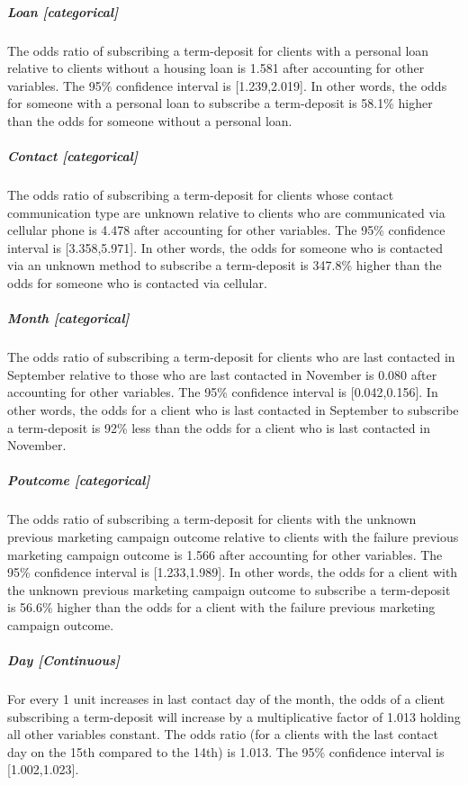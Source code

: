 \documentclass[]{article}
\let\oldsubparagraph\subparagraph
\renewcommand{\subparagraph}[1]{\oldsubparagraph{#1}\mbox{}}
\begin{document}
\subparagraph{Loan {[}categorical{]}}\label{loan-categorical}

The odds ratio of subscribing a term-deposit for clients with a personal
loan relative to clients without a housing loan is 1.581 after
accounting for other variables. The 95\% confidence interval is
{[}1.239,2.019{]}. In other words, the odds for someone with a personal
loan to subscribe a term-deposit is 58.1\% higher than the odds for
someone without a personal loan.

\subparagraph{Contact {[}categorical{]}}\label{contact-categorical}

The odds ratio of subscribing a term-deposit for clients whose contact
communication type are unknown relative to clients who are communicated
via cellular phone is 4.478 after accounting for other variables. The
95\% confidence interval is {[}3.358,5.971{]}. In other words, the odds
for someone who is contacted via an unknown method to subscribe a
term-deposit is 347.8\% higher than the odds for someone who is
contacted via cellular.

\subparagraph{Month {[}categorical{]}}\label{month-categorical}

The odds ratio of subscribing a term-deposit for clients who are last
contacted in September relative to those who are last contacted in
November is 0.080 after accounting for other variables. The 95\%
confidence interval is {[}0.042,0.156{]}. In other words, the odds for a
client who is last contacted in September to subscribe a term-deposit is
92\% less than the odds for a client who is last contacted in November.

\subparagraph{Poutcome {[}categorical{]}}\label{poutcome-categorical}

The odds ratio of subscribing a term-deposit for clients with the
unknown previous marketing campaign outcome relative to clients with the
failure previous marketing campaign outcome is 1.566 after accounting
for other variables. The 95\% confidence interval is {[}1.233,1.989{]}.
In other words, the odds for a client with the unknown previous
marketing campaign outcome to subscribe a term-deposit is 56.6\% higher
than the odds for a client with the failure previous marketing campaign
outcome.

\subparagraph{Day {[}Continuous{]}}\label{day-continuous}

For every 1 unit increases in last contact day of the month, the odds of
a client subscribing a term-deposit will increase by a multiplicative
factor of 1.013 holding all other variables constant. The odds ratio
(for a clients with the last contact day on the 15th compared to the
14th) is 1.013. The 95\% confidence interval is {[}1.002,1.023{]}.
\end{document}
